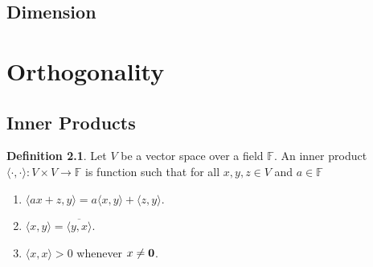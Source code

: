 \documentclass[oneside, 12pt]{book}
\theoremstyle{definition}
\newtheorem{defn}{Definition}[section]
\begin{document}
\section{Dimension}
\chapter{Orthogonality}
\section{Inner Products}
\begin{defn}
  \label{defn_innerprod}
  Let $V$ be a vector space over a field $\mathbb{F}$. An inner product $\langle \cdot , \cdot \rangle: V \times V \to \mathbb{F}$ is  function such that
  for all $x, y, z \in V$ and $a \in \mathbb{F}$
  \begin{enumerate}
    \item $\langle ax + z , y \rangle = a\langle x , y \rangle + \langle z , y \rangle$.
    \item $\langle x , y \rangle = \overline{ \langle y , x \rangle }$.
    \item $\langle x , x \rangle > 0$ whenever $x \neq \bold{0}$.
  \end{enumerate}
\end{defn}
\end{document}
